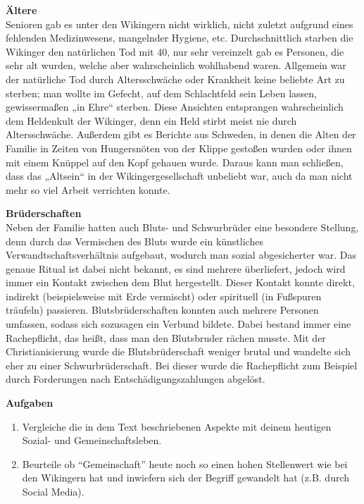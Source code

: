 \documentclass[12pt,a4paper,ngerman,openany]{book}
\newcommand{\aufgaben}[1]{
  \begin{tcolorbox}
    \textbf{Aufgaben}
    \begin{enumerate}
      #1
    \end{enumerate}
  \end{tcolorbox}
} %
\begin{document}
\textbf{Ältere}\\
Senioren gab es unter den Wikingern nicht wirklich, nicht zuletzt aufgrund eines
fehlenden Medizinwesens, mangelnder Hygiene, etc. Durchschnittlich starben die Wikinger
den natürlichen Tod mit 40, nur sehr vereinzelt gab es Personen, die sehr alt wurden, welche aber wahrscheinlich wohlhabend waren. Allgemein war der natürliche Tod durch Altersschwäche oder Krankheit keine beliebte Art zu sterben; man wollte im Gefecht, auf dem Schlachtfeld sein Leben lassen, gewissermaßen „in Ehre“ sterben. Diese Ansichten entsprangen wahrscheinlich dem Heldenkult der Wikinger, denn ein Held stirbt meist nie durch Altersschwäche. Außerdem gibt es Berichte aus Schweden, in denen die Alten der Familie in Zeiten von Hungersnöten von der Klippe gestoßen wurden oder ihnen mit einem Knüppel auf den Kopf gehauen wurde. Daraus kann man schließen, dass das „Altsein“ in der Wikingergesellschaft unbeliebt war, auch da man nicht mehr so viel Arbeit verrichten konnte.

\textbf{Brüderschaften}\\
Neben der Familie hatten auch Bluts- und Schwurbrüder eine besondere Stellung, denn
durch das Vermischen des Bluts wurde ein künstliches Verwandtschaftsverhältnis aufgebaut,
wodurch man sozial abgesicherter war. Das genaue Ritual ist dabei nicht bekannt, es sind mehrere überliefert, jedoch wird immer ein Kontakt zwischen dem Blut hergestellt. Dieser Kontakt konnte direkt, indirekt (beispielsweise mit Erde vermischt) oder spirituell (in Fußspuren träufeln) passieren. Blutsbrüderschaften konnten auch mehrere Personen umfassen, sodass sich sozusagen ein Verbund bildete.
Dabei bestand immer eine Rachepflicht, das heißt, dass man den Blutsbruder rächen musste. Mit der Christianisierung wurde die Blutsbrüderschaft weniger brutal und wandelte sich eher zu einer Schwurbrüderschaft. Bei dieser wurde die Rachepflicht zum Beispiel durch Forderungen nach Entschädigungszahlungen abgelöst.

\aufgaben{
  \item Vergleiche die in dem Text beschriebenen Aspekte mit deinem heutigen Sozial- und Gemeinschaftsleben.
  \item Beurteile ob “Gemeinschaft” heute noch so einen hohen Stellenwert wie bei den Wikingern hat und inwiefern sich der Begriff gewandelt hat (z.B. durch Social Media).
}
\end{document}
